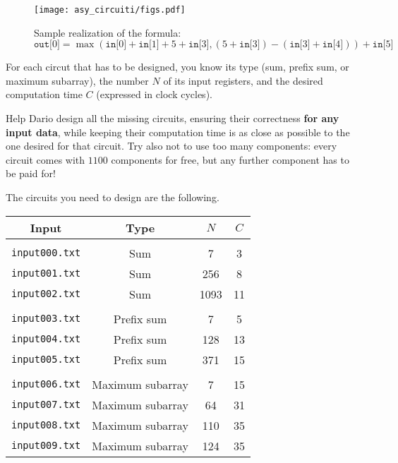 \begin{figure}[t]%
	\centering\texttt{[image: asy\_circuiti/figs.pdf]}
	\caption{Sample realization of the formula:
	\[
	\texttt{out[$0$]} = \max(\texttt{in[$0$]} + \texttt{in[$1$]} + 5 + \texttt{in[$3$]},
	(5 + \texttt{in[$3$]}) - (\texttt{in[$3$]} + \texttt{in[$4$]})) + \texttt{in[$5$]}
	\]} \label{fig}
\end{figure}

For each circut that has to be designed, you know its type (sum, prefix sum, or maximum subarray), the number $N$ of its input registers, and the desired computation time $C$ (expressed in clock cycles).

Help Dario design all the missing circuits, ensuring their correctness \textbf{for any input data}, while keeping their computation time is as close as possible to the one desired for that circuit. Try also not to use too many components: every circuit comes with $1100$ components for free, but any further component has to be paid for!

\pagebreak
The circuits you need to design are the following.
\begin{center}
	\begin{tabular}{c|c|c|c}
		\textbf{Input} & \textbf{Type} & $N$ & $C$ \\[5pt]
		\hline \\[-10pt]
		\texttt{input000.txt} & Sum & 7 & 3 \\
		\texttt{input001.txt} & Sum & 256 & 8 \\
		\texttt{input002.txt} & Sum & 1093 & 11 \\[5pt]
		\hline \\[-10pt]
		\texttt{input003.txt} & Prefix sum & 7 & 5 \\
		\texttt{input004.txt} & Prefix sum & 128 & 13 \\
		\texttt{input005.txt} & Prefix sum & 371 & 15 \\[5pt]
		\hline \\[-10pt]
		\texttt{input006.txt} & Maximum subarray & 7 & 15 \\
		\texttt{input007.txt} & Maximum subarray & 64 & 31 \\
		\texttt{input008.txt} & Maximum subarray & 110 & 35 \\
		\texttt{input009.txt} & Maximum subarray & 124 & 35 \\
	\end{tabular}
\end{center}


